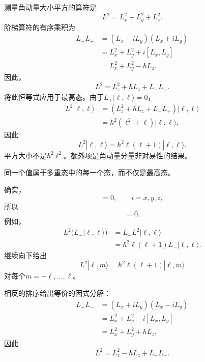 测量角动量大小平方的算符是
\begin{equation}
L^2=L_x^2+L_y^2+L_z^2.
\end{equation}
阶梯算符的有序乘积为
\begin{align}
L_-L_+
&=(L_x-iL_y)(L_x+iL_y) \\
&=L_x^2+L_y^2+i[L_x,L_y] \\
&=L_x^2+L_y^2-\hbar L_z.
\end{align}
因此，
\begin{equation}
L^2=L_z^2+\hbar L_z+L_-L_+.
\end{equation}
将此恒等式应用于最高态。由于\(L_+|\ell,\ell\rangle=0\)，
\begin{align}
L^2|\ell,\ell\rangle
&=\left(L_z^2+\hbar L_z+L_-L_+\right)|\ell,\ell\rangle \\
&=\hbar^2\left(\ell^2+\ell\right)|\ell,\ell\rangle,
\end{align}
因此
\begin{equation}
L^2|\ell,\ell\rangle
=\hbar^2\ell(\ell+1)|\ell,\ell\rangle.
\end{equation}
平方大小不是\(\hbar^2\ell^2\)。额外项是角动量分量非对易性的结果。

同一个值属于多重态中的每一个态，而不仅是最高态。

\begin{classroomqa}
\end{classroomqa}

确实，
\begin{equation}
[L^2,L_i]=0,
\qquad i=x,y,z,
\end{equation}
所以
\begin{equation}
[L^2,L_\pm]=0.
\end{equation}
例如，
\begin{align}
L^2\bigl(L_-|\ell,\ell\rangle\bigr)
&=L_-L^2|\ell,\ell\rangle \\
&=\hbar^2\ell(\ell+1)L_-|\ell,\ell\rangle.
\end{align}
继续向下给出
\begin{equation}
L^2|\ell,m\rangle
=\hbar^2\ell(\ell+1)|\ell,m\rangle
\end{equation}
对每个\(m=-\ell,\ldots,\ell\)。

相反的排序给出等价的因式分解：
\begin{align}
L_+L_-
&=(L_x+iL_y)(L_x-iL_y) \\
&=L_x^2+L_y^2-i[L_x,L_y] \\
&=L_x^2+L_y^2+\hbar L_z,
\end{align}
因此
\begin{equation}
L^2=L_z^2-\hbar L_z+L_+L_-.
\end{equation}

